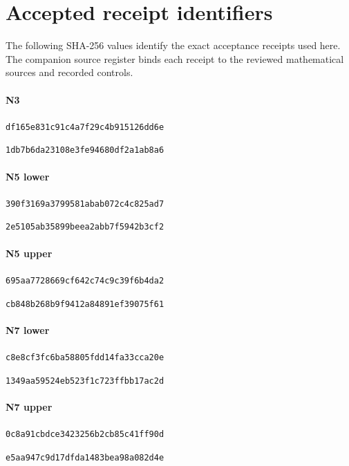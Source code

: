 \appendix
\section{Accepted receipt identifiers}
The following SHA-256 values identify the exact acceptance receipts used here. The companion source register binds each receipt to the reviewed mathematical sources and recorded controls.
\paragraph{N3}
\noindent\texttt{df165e831c91c4a7f29c4b915126dd6e}\par
\noindent\texttt{1db7b6da23108e3fe94680df2a1ab8a6}\par
\paragraph{N5 lower}
\noindent\texttt{390f3169a3799581abab072c4c825ad7}\par
\noindent\texttt{2e5105ab35899beea2abb7f5942b3cf2}\par
\paragraph{N5 upper}
\noindent\texttt{695aa7728669cf642c74c9c39f6b4da2}\par
\noindent\texttt{cb848b268b9f9412a84891ef39075f61}\par
\paragraph{N7 lower}
\noindent\texttt{c8e8cf3fc6ba58805fdd14fa33cca20e}\par
\noindent\texttt{1349aa59524eb523f1c723ffbb17ac2d}\par
\paragraph{N7 upper}
\noindent\texttt{0c8a91cbdce3423256b2cb85c41ff90d}\par
\noindent\texttt{e5aa947c9d17dfda1483bea98a082d4e}\par
